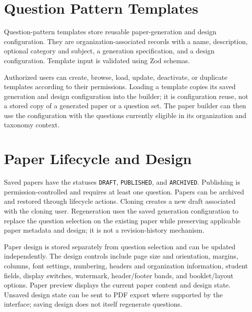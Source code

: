 \section{Question Pattern Templates}

Question-pattern templates store reusable paper-generation and design configuration. They are organization-associated records with a name, description, optional category and subject, a generation specification, and a design configuration. Template input is validated using Zod schemas.

Authorized users can create, browse, load, update, deactivate, or duplicate templates according to their permissions. Loading a template copies its saved generation and design configuration into the builder; it is configuration reuse, not a stored copy of a generated paper or a question set. The paper builder can then use the configuration with the questions currently eligible in its organization and taxonomy context.

\section{Paper Lifecycle and Design}

Saved papers have the statuses \texttt{DRAFT}, \texttt{PUBLISHED}, and \texttt{ARCHIVED}. Publishing is permission-controlled and requires at least one question. Papers can be archived and restored through lifecycle actions. Cloning creates a new draft associated with the cloning user. Regeneration uses the saved generation configuration to replace the question selection on the existing paper while preserving applicable paper metadata and design; it is not a revision-history mechanism.

Paper design is stored separately from question selection and can be updated independently. The design controls include page size and orientation, margins, columns, font settings, numbering, headers and organization information, student fields, display switches, watermark, header/footer bands, and booklet/layout options. Paper preview displays the current paper content and design state. Unsaved design state can be sent to PDF export where supported by the interface; saving design does not itself regenerate questions.

